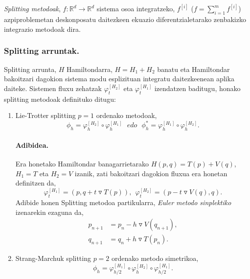 \emph{Splitting metodoak}, $f: \mathbb{R}^d \rightarrow \mathbb{R}^d$ sistema osoa integratzeko, $f^{[i]}$ ($f=\sum\limits_{i=1}^{m} f^{[i]}$) azpiproblemetan deskonposatu daitezkeen ekuazio diferentzialetarako zenbakizko integrazio metodoak dira.  

\subsubsection*{Splitting arruntak.}

Splitting arrunta, $H$ Hamiltondarra, $H=H_1+H_2$ banatu eta Hamiltondar bakoitzari dagokion sistema modu esplizituan integratu daitezkeenean aplika daiteke. Sistemen fluxu zehatzak $\varphi_t^{[H_2]}$ eta $\varphi_t^{[H_1]}$ izendatzen baditugu, honako splitting metodoak definituko ditugu:

\begin{enumerate}

\item Lie-Trotter splitting $p=1$ ordenako metodoak,
\begin{equation}
\phi_h = \varphi_h^{[H_2]} \circ \varphi_h^{[H_1]} \ \ \ edo \ \ \ \phi_h^{*} = \varphi_h^{[H_1]} \circ \varphi_h^{[H_2]}.
\label{eq:LieT}
\end{equation}


\paragraph*{Adibidea.}

Era honetako Hamiltondar banagarrietarako $H(p,q)=T(p)+V(q)$, $H_1=T$ eta $H_2=V$ izanik, zati bakoitzari dagokion fluxua era honetan definitzen da,
\begin{equation*}
\varphi_t^{[H_1]}=(p,q+t\triangledown T(p)), \ \ \varphi_t^{[H_2]}=(p-t\triangledown V(q),q). 
\end{equation*}
Adibide honen Splitting metodoa partikularra, \emph{Euler metodo sinplektiko} izenarekin ezaguna da,
\begin{align*}
p_{n+1}&=p_{n}-h \triangledown V(q_{n+1}), \\
q_{n+1}&=q_{n}+h \triangledown T(p_n).
\end{align*}  
   

\item Strang-Marchuk splitting $p=2$ ordenako metodo simetrikoa,
\begin{equation}
\phi_h =  \varphi_{{h}/{2}}^{[H_1]} \circ \varphi_h^{[H_2]} \circ \varphi_{{h}/{2}}^{[H_1]}.
\end{equation} 


\end{enumerate}
